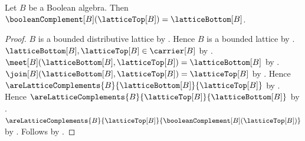 \begin{proposition}\label{boolean_complement_lattice_top}
    Let $B$ be a Boolean algebra.
    Then $\booleanComplement[B](\latticeTop[B])
        =\latticeBottom[B]$.
\end{proposition}
\begin{proof}
    $B$ is a bounded distributive lattice by
        .
    Hence $B$ is a bounded lattice by
        .
    $\latticeBottom[B],\latticeTop[B]\in\carrier[B]$ by
        .
    $\meet[B](\latticeBottom[B],\latticeTop[B])
        =\latticeBottom[B]$ by .
    $\join[B](\latticeBottom[B],\latticeTop[B])
        =\latticeTop[B]$ by .
    Hence $\areLatticeComplements
        {B}{\latticeBottom[B]}{\latticeTop[B]}$ by
        .
    Hence $\areLatticeComplements
        {B}{\latticeTop[B]}{\latticeBottom[B]}$ by
        .
    $\areLatticeComplements
        {B}{\latticeTop[B]}
        {\booleanComplement[B](\latticeTop[B])}$ by
        .
    Follows by .
\end{proof}

